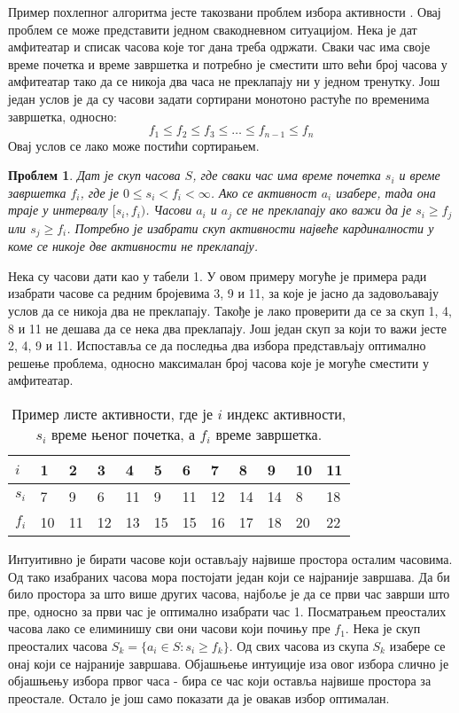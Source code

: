 \documentclass[a4paper, 12pt, ngerman]{article}
\newtheorem{problem}{Проблем}
\begin{document}
Пример похлепног алгоритма јесте такозвани проблем избора активности \cite{clrs}. Овај проблем се може представити једном свакодневном ситуацијом. Нека је дат амфитеатар и списак часова које тог дана треба одржати. Сваки час има своје време почетка и време завршетка и потребно је сместити што већи број часова у амфитеатар тако да се никоја два часа не преклапају ни у једном тренутку. Још један услов је да су часови задати сортирани монотоно растуће по временима завршетка, односно: 
$$ f_1 \le f_2 \le f_3 \le \ldots \le f_{n-1} \le f_n$$
Овај услов се лако може постићи сортирањем.

\begin{problem}
Дат је скуп часова $S$, где сваки час има време почетка $s_i$ и време завршетка $f_i$, где је $0 \le s_i < f_i < \infty$. Ако се активност $a_i$ изабере, тада она траје у интервалу $[s_i, f_i)$. Часови $a_i$ и $a_j$ се не преклапају ако важи да је $s_i \ge f_j$ или $s_j \ge f_i$. Потребно је изабрати скуп активности највеће кардиналности у коме се никоје две активности не преклапају.
\end{problem}

Нека су часови дати као у табели 1. У овом примеру могуће је примера ради изабрати часове са редним бројевима 3, 9 и 11, за које је јасно да задовољавају услов да се никоја два не преклапају. Такође је лако проверити да се за скуп 1, 4, 8 и 11 не дешава да се нека два преклапају. Још један скуп за који то важи јесте 2, 4, 9 и 11. Испоставља се да последња два избора представљају оптимално решење проблема, односно максималан број часова које је могуће сместити у амфитеатар.

\begin{table}[htbp]
\begin{tabularx}{\textwidth}{lXXXXXXXXXXX}
	$i$   & 1 & 2 & 3 & 4 & 5 & 6 & 7 & 8 & 9 & 10 & 11 \\
	\hline
	$s_i$ & 7 & 9 & 6 & 11 & 9 & 11 & 12 & 14 & 14 & 8  & 18 \\
	$f_i$ & 10 & 11 & 12 & 13 & 15 & 15 & 16 & 17 & 18 & 20 & 22 \\
\end{tabularx}
\caption{Пример листе активности, где је $i$ индекс активности, $s_i$ време њеног почетка, а $f_i$ време завршетка.}
\end{table}

Интуитивно је бирати часове који остављају највише простора осталим часовима. Од тако изабраних часова мора постојати један који се најраније завршава. Да би било простора за што више других часова, најбоље је да се први час заврши што пре, односно за први час је оптимално изабрати час 1. Посматрањем преосталих часова лако се елиминишу сви они часови који почињу пре $f_1$. Нека је скуп преосталих часова $S_k = \{a_i \in S : s_i \ge f_k\}$. Од свих часова из скупа $S_k$ изабере се онај који се најраније завршава. Објашњење интуиције иза овог избора слично је објашњењу избора првог часа - бира се час који оставља највише простора за преостале. Остало је још само показати да је овакав избор оптималан.
\end{document}

